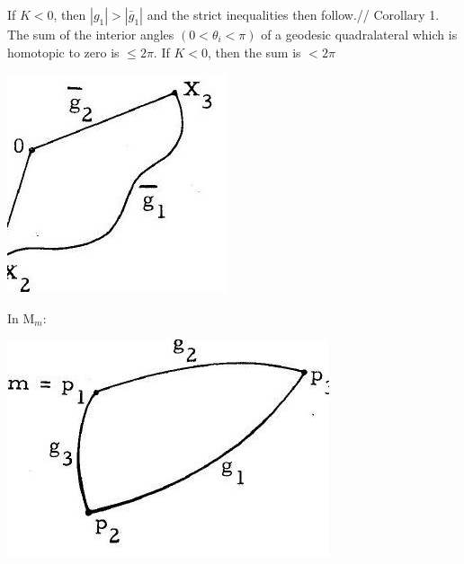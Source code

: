 \documentclass[10pt]{article}
\begin{document}
If $K<0$, then $\left|g_{1}\right|>\left|\bar{g}_{1}\right|$ and the strict inequalities then follow.// Corollary 1. The sum of the interior angles $\left(0<\theta_{i}<\pi\right)$ of a geodesic quadralateral which is homotopic to zero is $\leq 2 \pi$. If $K<0$, then the sum is $<2 \pi$

\includegraphics[max width=\textwidth]{2022_07_16_f4e476ee2159dc67e746g-90}

In $\mathrm{M}_{m}:$

\includegraphics[max width=\textwidth]{2022_07_16_f4e476ee2159dc67e746g-90(1)}
\end{document}
